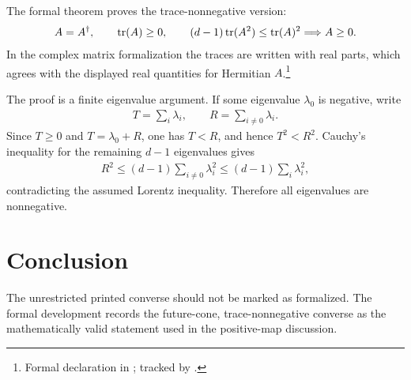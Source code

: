 \documentclass{article}
\begin{document}
The formal theorem proves the trace-nonnegative version:
\begin{align}
  A=A^\dagger,\qquad
  \operatorname{tr}(A)\ge 0,\qquad
  (d-1)\operatorname{tr}(A^2)\le \operatorname{tr}(A)^2
  \Longrightarrow A\ge 0.
\end{align}
In the complex matrix formalization the traces are written with real parts,
which agrees with the displayed real quantities for Hermitian \(A\).\footnote{
Formal declaration
in ; tracked by
.}

The proof is a finite eigenvalue argument.  If some eigenvalue \(\lambda_0\) is
negative, write
\begin{align}
  T=\sum_i\lambda_i,\qquad
  R=\sum_{i\ne 0}\lambda_i .
\end{align}
Since \(T\ge0\) and \(T=\lambda_0+R\), one has \(T<R\), and hence
\(T^2<R^2\).  Cauchy's inequality for the remaining \(d-1\) eigenvalues gives
\begin{align}
  R^2\le (d-1)\sum_{i\ne 0}\lambda_i^2
       \le (d-1)\sum_i\lambda_i^2,
\end{align}
contradicting the assumed Lorentz inequality.  Therefore all eigenvalues are
nonnegative.

\section{Conclusion}

The unrestricted printed converse should not be marked as formalized.  The
formal development records the future-cone, trace-nonnegative converse as the
mathematically valid statement used in the positive-map discussion.



\end{document}

